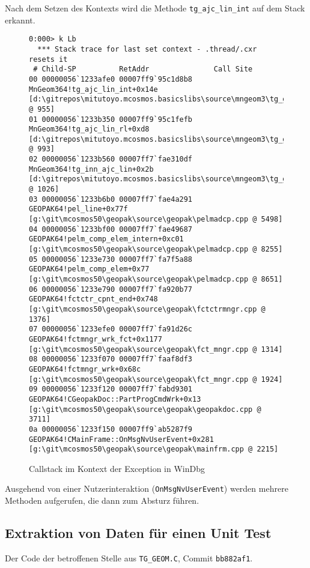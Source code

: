 Nach dem Setzen des Kontexts wird die Methode \verb|tg_ajc_lin_int| auf dem Stack erkannt.

\begin{figure}[H]
\begin{lstlisting}
0:000> k Lb
  *** Stack trace for last set context - .thread/.cxr resets it
 # Child-SP          RetAddr               Call Site
00 00000056`1233afe0 00007ff9`95c1d8b8     MnGeom364!tg_ajc_lin_int+0x14e [d:\gitrepos\mitutoyo.mcosmos.basicslibs\source\mngeom3\tg_geom.c @ 955] 
01 00000056`1233b350 00007ff9`95c1fefb     MnGeom364!tg_ajc_lin_rl+0xd8 [d:\gitrepos\mitutoyo.mcosmos.basicslibs\source\mngeom3\tg_geom.c @ 993] 
02 00000056`1233b560 00007ff7`fae310df     MnGeom364!tg_inn_ajc_lin+0x2b [d:\gitrepos\mitutoyo.mcosmos.basicslibs\source\mngeom3\tg_geom.c @ 1026] 
03 00000056`1233b6b0 00007ff7`fae4a291     GEOPAK64!pel_line+0x77f [g:\git\mcosmos50\geopak\source\geopak\pelmadcp.cpp @ 5498] 
04 00000056`1233bf00 00007ff7`fae49687     GEOPAK64!pelm_comp_elem_intern+0xc01 [g:\git\mcosmos50\geopak\source\geopak\pelmadcp.cpp @ 8255] 
05 00000056`1233e730 00007ff7`fa7f5a88     GEOPAK64!pelm_comp_elem+0x77 [g:\git\mcosmos50\geopak\source\geopak\pelmadcp.cpp @ 8651] 
06 00000056`1233e790 00007ff7`fa920b77     GEOPAK64!fctctr_cpnt_end+0x748 [g:\git\mcosmos50\geopak\source\geopak\fctctrmngr.cpp @ 1376] 
07 00000056`1233efe0 00007ff7`fa91d26c     GEOPAK64!fctmngr_wrk_fct+0x1177 [g:\git\mcosmos50\geopak\source\geopak\fct_mngr.cpp @ 1314] 
08 00000056`1233f070 00007ff7`faaf8df3     GEOPAK64!fctmngr_wrk+0x68c [g:\git\mcosmos50\geopak\source\geopak\fct_mngr.cpp @ 1924] 
09 00000056`1233f120 00007ff7`fabd9301     GEOPAK64!CGeopakDoc::PartProgCmdWrk+0x13 [g:\git\mcosmos50\geopak\source\geopak\geopakdoc.cpp @ 3711] 
0a 00000056`1233f150 00007ff9`ab5287f9     GEOPAK64!CMainFrame::OnMsgNvUserEvent+0x281 [g:\git\mcosmos50\geopak\source\geopak\mainfrm.cpp @ 2215] 
\end{lstlisting}
\caption{Callstack im Kontext der Exception in WinDbg}
\end{figure}

Ausgehend von einer Nutzerinteraktion (\verb|OnMsgNvUserEvent|) werden mehrere Methoden aufgerufen, die dann zum Absturz führen.

\subsection{Extraktion von Daten für einen Unit Test}

Der Code der betroffenen Stelle aus \verb|TG_GEOM.C|, Commit \verb|bb882af1|.

